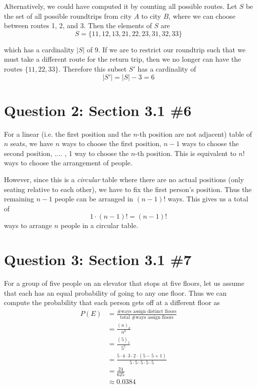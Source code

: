 \documentclass[11pt, oneside]{article}   	%
\begin{document}
Alternatively, we could have computed it by counting all possible routes. Let $S$ be the set of all possible roundtrips from city $A$ to city $B$, where we can choose between routes 1, 2, and 3. Then the elements of $S$ are
$$S = \{11, 12, 13, 21, 22, 23, 31, 32, 33 \}$$

which has a cardinality $|S|$ of 9. If we are to restrict our roundtrip such that we must take a different route for the return trip, then we no longer can have the routes $\{11, 22, 33\}$. Therefore this subset $S'$ has a cardinality of
$$|S'| = |S| - 3 = 6$$


\section*{Question 2: Section 3.1 \#6}

For a linear (i.e. the first position and the $n$-th position are not adjacent) table of $n$ seats, we have $n$ ways to choose the first position, $n-1$ ways to choose the second position, .... , 1 way to choose the $n$-th position. This is equivalent to $n!$ ways to choose the arrangement of people. 

However, since this is a \textit{circular} table where there are no actual positions (only seating relative to each other), we have to fix the first person's position. Thus the remaining $n-1$ people can be arranged in $(n-1)!$ ways. This gives us a total of
$$1 \cdot (n-1)! = (n-1)!$$
ways to arrange $n$ people in a circular table.


\section*{Question 3: Section 3.1 \#7}

For a group of five people on an elevator that stops at five floors, let us assume that each has an equal probability of going to any one floor. Thus we can compute the probability that each person gets off at a different floor as
\begin{align*}
P(E) & = \frac{\text{\# ways assign distinct floors}}{\text{total \# ways assign floors}} \\
& = \frac{(n)_k}{n^k} \\
& = \frac{(5)_5}{5^5} \\
& = \frac{5 \cdot 4 \cdot 3 \cdot 2 \cdot (5-5+1)}{5 \cdot 5 \cdot 5 \cdot 5 \cdot 5} \\
& = \frac{24}{625} \\
& \approx 0.0384
\end{align*}
\end{document}
